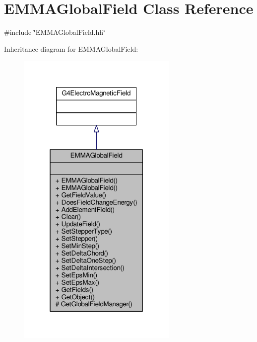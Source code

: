 \hypertarget{classEMMAGlobalField}{}\section{E\+M\+M\+A\+Global\+Field Class Reference}
\label{classEMMAGlobalField}


{\ttfamily \#include \char`\"{}E\+M\+M\+A\+Global\+Field.\+hh\char`\"{}}



Inheritance diagram for E\+M\+M\+A\+Global\+Field\+:
\nopagebreak
\begin{figure}[H]
\begin{center}
\leavevmode
\includegraphics[width=220pt]{classEMMAGlobalField__inherit__graph}
\end{center}
\end{figure}


